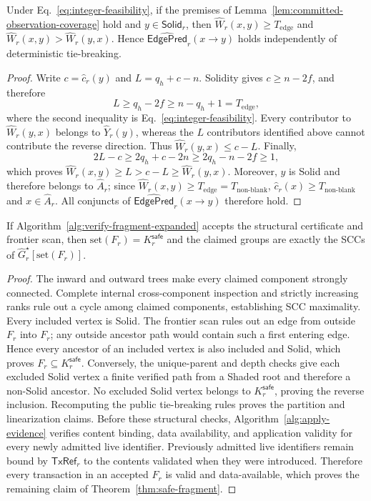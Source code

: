 \begin{lemma}
\label{lem:fair-edge-formation}
Under Eq.~\eqref{eq:integer-feasibility}, if the premises of
Lemma~\ref{lem:committed-observation-coverage} hold and
$y\in\mathsf{Solid}_r$, then
$\widehat W_r(x,y)\ge T_{\mathrm{edge}}$ and
$\widehat W_r(x,y)>\widehat W_r(y,x)$.  Hence
$\widehat{\mathsf{EdgePred}}_r(x\to y)$ holds independently
of deterministic tie-breaking.
\end{lemma}

\begin{proof}
Write $c=\widehat c_r(y)$ and $L=q_h+c-n$.  Solidity gives
$c\ge n-2f$, and therefore
\[
 L\ge q_h-2f\ge n-q_h+1=T_{\mathrm{edge}},
\]
where the second inequality is Eq.~\eqref{eq:integer-feasibility}.  Every
contributor to $\widehat W_r(y,x)$ belongs to $\widehat Y_r(y)$, whereas the $L$ contributors
identified above cannot contribute the reverse direction.  Thus
$\widehat W_r(y,x)\le c-L$.  Finally,
\[
 2L-c\ge2q_h+c-2n\ge2q_h-n-2f\ge1,
\]
which proves
$\widehat W_r(x,y)\ge L>c-L\ge\widehat W_r(y,x)$.  Moreover, $y$ is Solid and
therefore belongs to $\widehat A_r$; since
$\widehat W_r(x,y)\ge T_{\mathrm{edge}}=T_{\mathrm{non\mbox{-}blank}}$,
$\widehat c_r(x)\ge T_{\mathrm{non\mbox{-}blank}}$ and
$x\in\widehat A_r$.  All conjuncts of
$\widehat{\mathsf{EdgePred}}_r(x\to y)$ therefore
hold.
\end{proof}

\begin{lemma}
\label{lem:safe-closure-certificate}
If Algorithm~\ref{alg:verify-fragment-expanded} accepts the structural certificate and
frontier scan, then $\mathrm{set}(F_r)=K_r^{\mathsf{safe}}$ and the claimed
groups are exactly the SCCs of
$\widehat G_r^\star[\mathrm{set}(F_r)]$.
\end{lemma}

\begin{proof}
The inward and outward trees make every claimed component strongly connected.
Complete internal cross-component inspection and strictly increasing ranks
rule out a cycle among claimed components, establishing SCC maximality.  Every
included vertex is Solid.  The frontier scan rules out an edge from outside
$F_r$ into $F_r$; any outside ancestor path would contain such a first entering
edge.  Hence every ancestor of an included vertex is also included and Solid,
which proves $F_r\subseteq K_r^{\mathsf{safe}}$.  Conversely, the
unique-parent and depth checks give each excluded Solid vertex a finite
verified path from a Shaded root and therefore a non-Solid ancestor.  No
excluded Solid vertex belongs to
$K_r^{\mathsf{safe}}$, proving the reverse inclusion.  Recomputing the public
tie-breaking rules proves the partition and linearization claims.  Before
these structural checks, Algorithm~\ref{alg:apply-evidence} verifies content
binding, data availability, and application validity for every newly admitted
live identifier.  Previously admitted live identifiers remain bound by
$\mathsf{TxRef}_r$ to the contents validated when they were introduced.
Therefore every transaction in an accepted $F_r$ is valid and data-available,
which proves the remaining claim of Theorem~\ref{thm:safe-fragment}.
\end{proof}

